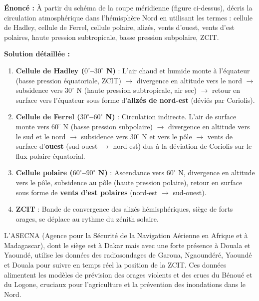 \documentclass[11pt]{article}
\begin{document}
\begin{exoresolu}
\textbf{Énoncé :} À partir du schéma de la coupe méridienne (figure ci-dessus), décris la circulation atmosphérique dans l'hémisphère Nord en utilisant les termes : cellule de Hadley, cellule de Ferrel, cellule polaire, alizés, vents d'ouest, vents d'est polaires, haute pression subtropicale, basse pression subpolaire, ZCIT.

\textbf{Solution détaillée :}
\begin{enumerate}
\item \textbf{Cellule de Hadley ($0^\circ$–$30^\circ$ N)} : L'air chaud et humide monte à l'équateur (basse pression équatoriale, ZCIT) $\rightarrow$ divergence en altitude vers le nord $\rightarrow$ subsidence vers $30^\circ$ N (haute pression subtropicale, air sec) $\rightarrow$ retour en surface vers l'équateur sous forme d'\textbf{alizés de nord-est} (déviés par Coriolis).
\item \textbf{Cellule de Ferrel ($30^\circ$–$60^\circ$ N)} : Circulation indirecte. L'air de surface monte vers $60^\circ$ N (basse pression subpolaire) $\rightarrow$ divergence en altitude vers le sud et le nord $\rightarrow$ subsidence vers $30^\circ$ N et vers le pôle $\rightarrow$ vents de surface d'\textbf{ouest} (sud-ouest $\rightarrow$ nord-est) dus à la déviation de Coriolis sur le flux polaire-équatorial.
\item \textbf{Cellule polaire ($60^\circ$–$90^\circ$ N)} : Ascendance vers $60^\circ$ N, divergence en altitude vers le pôle, subsidence au pôle (haute pression polaire), retour en surface sous forme de \textbf{vents d'est polaires} (nord-est $\rightarrow$ sud-ouest).
\item \textbf{ZCIT} : Bande de convergence des alizés hémisphériques, siège de forts orages, se déplace au rythme du zénith solaire.
\end{enumerate}
\end{exoresolu}

\begin{savaistu}
L'ASECNA (Agence pour la Sécurité de la Navigation Aérienne en Afrique et à Madagascar), dont le siège est à Dakar mais avec une forte présence à Douala et Yaoundé, utilise les données des radiosondages de Garoua, Ngaoundéré, Yaoundé et Douala pour suivre en temps réel la position de la ZCIT. Ces données alimentent les modèles de prévision des orages violents et des crues du Bénoué et du Logone, cruciaux pour l'agriculture et la prévention des inondations dans le Nord.
\end{savaistu}
\end{document}
